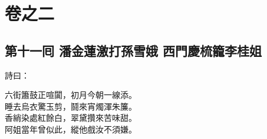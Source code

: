 \part*{{\titlename}卷之二}



\chapter*{第十一囘 潘金蓮激打孫雪娥 西門慶梳籠李桂姐}


詩曰：

\begin{myquote}
六街簫鼓正喧闐，初月今朝一線添。\\睡去烏衣驚玉剪，鬪來宵燭渾朱簾。\\香綃染處紅餘白，翠黛攢來苦味甜。\\阿姐當年曾似此，縱他戲汝不須嫌。
\end{myquote}

